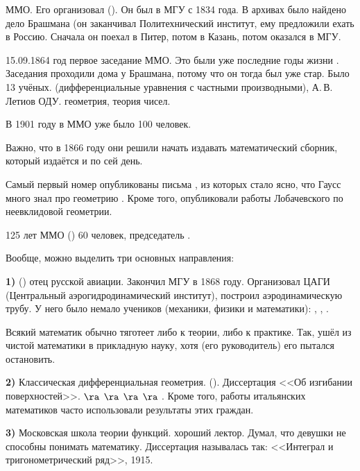 \documentclass[a4paper,oneside,fleqn,10pt]{article}
\begin{document}
ММО. Его организовал  ().  Он был
в МГУ с 1834 года.  В архивах было найдено дело Брашмана (он
заканчивал Политехнический институт, ему предложили ехать в
Россию. Сначала он поехал в Питер, потом в Казань, потом оказался в
МГУ.

15.09.1864 год первое заседание ММО. Это были уже последние годы жизни
.  Заседания проходили дома у Брашмана,
потому что он тогда был уже стар.  Было 13
учёных.  (дифференциальные уравнения с частными
производными), А.\,В.\,Летиов ОДУ.  геометрия,
 теория чисел.

В 1901 году в ММО уже было 100 человек.

Важно, что в 1866 году они решили начать издавать математический
сборник, который издаётся и по сей день.

Самый первый номер опубликованы письма 
, из которых стало ясно, что Гаусс много знал
про геометрию . Кроме того,
опубликовали работы Лобачевского по неевклидовой геометрии.

125 лет ММО () 60 человек, председатель
.

Вообще, можно выделить три основных направления:

\textbf{1)}  () отец русской
авиации.  Закончил МГУ в 1868 году. Организовал \hbox{ЦАГИ}
(Центральный аэрогидродинамический институт), построил
аэродинамическую трубу.  У него было немало учеников (механики, физики
и математики): , ,
.

Всякий математик обычно тяготеет либо к теории, либо к практике.  Так,
 ушёл из чистой математики в прикладную науку, хотя
 (его руководитель) его пытался остановить.

\textbf{2)} Классическая дифференциальная
геометрия.  ().  Диссертация <<Об
изгибании поверхностей>>.   $\ra$  $\ra$
 $\ra$  $\ra$ .  Кроме
того, работы итальянских математиков часто использовали результаты
этих граждан.

\textbf{3)} Московская школа теории функций.    хороший
лектор.  Думал, что девушки не способны понимать математику.
Диссертация  называлась так: <<Интеграл и
тригонометрический ряд>>, 1915.
\end{document}
